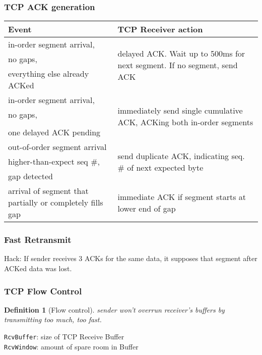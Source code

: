 \documentclass[10pt, a4paper, twocolumn]{scrartcl}
\newtheorem{definition}{Definition}
\begin{document}
\subsubsection{TCP ACK generation}

\begin{tabular}{p{4cm}|p{4cm}}
	Event &		TCP Receiver action \\ \hline \hline
	in-order segment arrival, &	\multirow{3}{4cm}{delayed ACK. Wait up to 500ms for next segment. If no segment, send ACK} \\ 
	no gaps, &	\\
	everything else already ACKed &	\\ \hline
	in-order segment arrival, &	\multirow{4}{4cm}{immediately send single cumulative ACK, ACKing both in-order segments} \\ 
	no gaps, &	\\
	 &	\\
	one delayed ACK pending &	\\ \hline
	out-of-order segment arrival &	\multirow{3}{4cm}{send duplicate ACK, indicating seq. \# of next expected byte} \\ 
	higher-than-expect seq \#, &	\\
	gap detected &	\\ \hline
	arrival of segment that partially or completely fills gap &	immediate ACK if segment starts at lower end of gap \\ \hline
\end{tabular}

\subsubsection{Fast Retransmit}

Hack: If sender receives 3 ACKs for the same data, it supposes that segment after ACKed data was lost.

\subsubsection{TCP Flow Control}

\begin{definition}[Flow control]
	sender won't overrun receiver's buffers by transmitting too much, too fast.
\end{definition}

\verb#RcvBuffer#: size of TCP Receive Buffer\\
\verb#RcvWindow#: amount of spare room in Buffer\\
\end{document}
